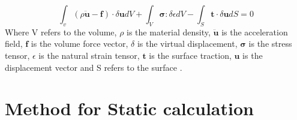 \begin{equation}
    \int_v (\rho \boldsymbol{\ddot{u}} - \boldsymbol{f}) \cdot \delta \boldsymbol{u}dV + \int_V \boldsymbol{\sigma}: \delta \epsilon dV - \int_S \boldsymbol{t} \cdot \delta \boldsymbol{u} dS =0
    \label{eq:virtual}
\end{equation}
Where V refers to the volume, $\rho$ is the material density, $ \boldsymbol{\ddot{u}}$ is the acceleration field, $ \boldsymbol{f}$ is the volume force vector, $\delta$ is the virtual displacement,  $\boldsymbol{\sigma}$ is the stress tensor, $\epsilon$ is the natural strain tensor, $\boldsymbol{t}$ is the surface traction, $\boldsymbol{u}$ is the displacement vector and S refers to the surface \cite{Bflextheory2013}. 

\section{Method for Static calculation}
